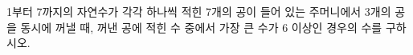 \hspace*{2mm}\begin{minipage}[t]{\dimexpr\linewidth-2mm\relax}\vspace{0pt}
1부터 7까지의 자연수가 각각 하나씩 적힌 7개의 공이 들어 있는 주머니에서 3개의 공을 동시에 꺼낼 때, 꺼낸 공에 적힌 수 중에서 가장 큰 수가 6 이상인 경우의 수를 구하시오.\end{minipage}
